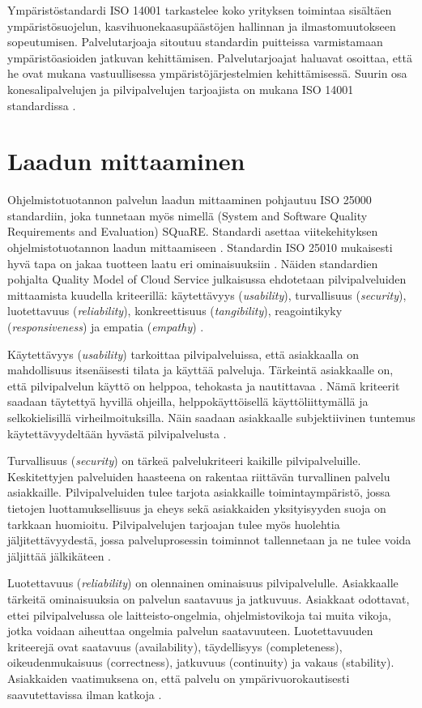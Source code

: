 Ympäristöstandardi ISO 14001 tarkastelee koko yrityksen toimintaa sisältäen ympäristösuojelun, kasvihuonekaasupäästöjen hallinnan ja ilmastomuutokseen sopeutumisen. Palvelutarjoaja sitoutuu standardin puitteissa varmistamaan ympäristöasioiden jatkuvan kehittämisen. Palvelutarjoajat haluavat osoittaa, että he ovat mukana vastuullisessa ympäristöjärjestelmien kehittämisessä. Suurin osa konesalipalvelujen ja pilvipalvelujen tarjoajista on mukana ISO 14001 standardissa \citep{iso14000}.
\section{Laadun mittaaminen}
Ohjelmistotuotannon palvelun laadun mittaaminen pohjautuu ISO 25000 standardiin, joka tunnetaan myös nimellä (System and Software Quality Requirements and Evaluation) SQuaRE. Standardi asettaa viitekehityksen ohjelmistotuotannon laadun mittaamiseen \citep{iso25000}. Standardin ISO 25010 mukaisesti hyvä tapa on jakaa tuotteen laatu eri ominaisuuksiin \citep{iso25010}. Näiden standardien pohjalta Quality Model of Cloud Service julkaisussa ehdotetaan pilvipalveluiden mittaamista kuudella kriteerillä: käytettävyys (\emph{usability}), turvallisuus (\emph{security}), luotettavuus (\emph{reliability}), konkreettisuus (\emph{tangibility}), reagointikyky (\emph{responsiveness}) ja empatia (\emph{empathy}) \citep{qualitymodel}.

Käytettävyys (\emph{usability}) tarkoittaa pilvipalveluissa, että asiakkaalla on mahdollisuus itsenäisesti tilata ja käyttää palveluja. Tärkeintä asiakkaalle on, että pilvipalvelun käyttö on helppoa, tehokasta ja nautittavaa \citep{adaptive}. Nämä kriteerit saadaan täytettyä hyvillä ohjeilla, helppokäyttöisellä käyttöliittymällä ja selkokielisillä virheilmoituksilla. Näin saadaan asiakkaalle subjektiivinen tuntemus käytettävyydeltään hyvästä pilvipalvelusta \citep{qualitymodel}.

Turvallisuus (\emph{security}) on tärkeä palvelukriteeri kaikille pilvipalveluille. Keskitettyjen palveluiden haasteena on rakentaa riittävän turvallinen palvelu asiakkaille. Pilvipalveluiden tulee tarjota asiakkaille toimintaympäristö, jossa tietojen luottamuksellisuus ja eheys sekä asiakkaiden yksityisyyden suoja on tarkkaan huomioitu. Pilvipalvelujen tarjoajan tulee myös huolehtia jäljitettävyydestä, jossa palveluprosessin toiminnot tallennetaan ja ne tulee voida jäljittää jälkikäteen \citep{qualitymodel}.

Luotettavuus (\emph{reliability}) on olennainen ominaisuus pilvipalvelulle. Asiakkaalle tärkeitä ominaisuuksia on palvelun saatavuus ja jatkuvuus. Asiakkaat odottavat, ettei pilvipalvelussa ole laitteisto-ongelmia, ohjelmistovikoja tai muita vikoja, jotka voidaan aiheuttaa ongelmia palvelun saatavuuteen. Luotettavuuden kriteerejä ovat saatavuus (availability), täydellisyys (completeness), oikeudenmukaisuus (correctness), jatkuvuus (continuity) ja vakaus (stability). Asiakkaiden vaatimuksena on, että palvelu on ympärivuorokautisesti saavutettavissa ilman katkoja \citep{qualitymodel}.

